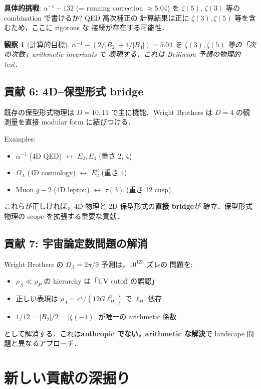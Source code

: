 \documentclass[11pt,a4paper]{article}
\newtheorem{observation}{観察}
\begin{document}
\textbf{具体的挑戦}: $\alpha^{-1} - 132$ (= running correction $\approx 5.04$)
を $\zeta(5)$, $\zeta(3)$ 等の combination で書けるか? QED 高次補正の
計算結果は正に $\zeta(3), \zeta(5)$ 等を含むため，ここに rigorous な
接続が存在する可能性．

\begin{observation}[計算的目標]
$\alpha^{-1} - (2/|B_2| + 4/|B_4|) = 5.04$
を $\zeta(3), \zeta(5)$ 等の「次の次数」arithmetic invariants で
表現する．これは Beilinson 予想の物理的 test．
\end{observation}

\subsection{貢献 6: 4D--保型形式 bridge}

既存の保型形式物理は $D = 10, 11$ で主に機能．Wright Brothers は
$D = 4$ の観測量を直接 modular form に結びつける．

Examples:
\begin{itemize}
\item $\alpha^{-1}$ (4D QED) $\leftrightarrow$ $E_2, E_4$ (重さ 2, 4)
\item $\Omega_\Lambda$ (4D cosmology) $\leftrightarrow$ $E_2^2$ (重さ 4)
\item Muon $g-2$ (4D lepton) $\leftrightarrow$ $\tau(3)$ (重さ 12 cusp)
\end{itemize}

これらが正しければ，4D 物理と 2D 保型形式の\textbf{直接 bridge}が
確立．保型形式物理の scope を拡張する重要な貢献．

\subsection{貢献 7: 宇宙論定数問題の解消}

Wright Brothers の $\Omega_\Lambda = 2\pi/9$ 予測は，$10^{123}$ ズレの
問題を:
\begin{itemize}
\item $\rho_\Lambda \ll \rho_P$ の hierarchy は「UV cutoff の誤認」
\item 正しい表現は $\rho_\Lambda = c^4/(12 G \ell_H^2)$ で $\ell_H$ 依存
\item $1/12 = |B_2|/2 = |\zeta(-1)|$ が唯一の arithmetic 係数
\end{itemize}
として解消する．これは\textbf{anthropic でない，arithmetic な解決}で
landscape 問題と異なるアプローチ．

\section{新しい貢献の深掘り}
\end{document}

